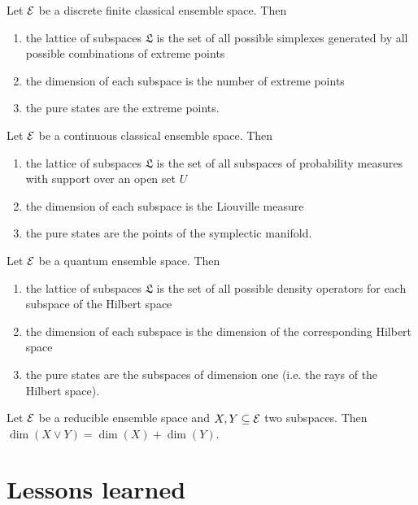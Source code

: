 \begin{conj}
	Let $\mathcal{E}$ be a discrete finite classical ensemble space. Then
	\begin{enumerate}
		\item the lattice of subspaces $\mathfrak{L}$ is the set of all possible simplexes generated by all possible combinations of extreme points
		\item the dimension of each subspace is the number of extreme points
		\item the pure states are the extreme points.
	\end{enumerate}
\end{conj}

\begin{conj}
	Let $\mathcal{E}$ be a continuous classical ensemble space. Then
	\begin{enumerate}
		\item the lattice of subspaces $\mathfrak{L}$ is the set of all subspaces of probability measures with support over an open set $U$
		\item the dimension of each subspace is the Liouville measure
		\item the pure states are the points of the symplectic manifold.
	\end{enumerate}
\end{conj}

\begin{conj}
	Let $\mathcal{E}$ be a quantum ensemble space. Then
	\begin{enumerate}
		\item the lattice of subspaces $\mathfrak{L}$ is the set of all possible density operators for each subspace of the Hilbert space
		\item the dimension of each subspace is the dimension of the corresponding Hilbert space
		\item the pure states are the subspaces of dimension one (i.e. the rays of the Hilbert space).
	\end{enumerate}
\end{conj}

\begin{conj}
	Let $\mathcal{E}$ be a reducible ensemble space and $X,Y \subseteq{\mathcal{E}}$ two subspaces. Then $\dim(X \vee Y) = \dim(X) + \dim(Y)$.
\end{conj}

\section{Lessons learned}

